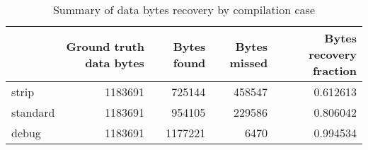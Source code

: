 \begin{table}
\centering
\caption{Summary of data bytes recovery by compilation case}
\label{table:opts-bytes-summary}
\begin{tabular}{lrrrr}
\toprule
{} &  Ground truth data bytes &  Bytes found &  Bytes missed &  Bytes recovery fraction \\
\midrule
strip    &                  1183691 &       725144 &        458547 &                 0.612613 \\
standard &                  1183691 &       954105 &        229586 &                 0.806042 \\
debug    &                  1183691 &      1177221 &          6470 &                 0.994534 \\
\bottomrule
\end{tabular}
\end{table}
